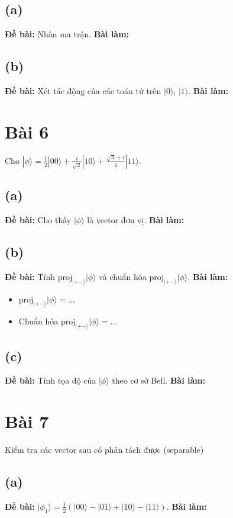 \subsection{(a)}
\textbf{Đề bài:} Nhân ma trận.
\textbf{Bài làm:}

\subsection{(b)}
\textbf{Đề bài:} Xét tác động của các toán tử trên $|0\rangle$, $|1\rangle$.
\textbf{Bài làm:}

\section{Bài 6}
Cho $|\phi\rangle=\frac{1}{2}|00\rangle+\frac{i}{\sqrt{2}}|10\rangle+\frac{\sqrt{3}+i}{4}|11\rangle$.

\subsection{(a)}
\textbf{Đề bài:} Cho thấy $|\phi\rangle$ là vector đơn vị.
\textbf{Bài làm:}

\subsection{(b)}
\textbf{Đề bài:} Tính $\mathrm{proj}_{|+-\rangle}|\phi\rangle$ và chuẩn hóa $\mathrm{proj}_{|+-\rangle}|\phi\rangle$.
\textbf{Bài làm:}
\begin{itemize}
    \item $\mathrm{proj}_{|+-\rangle}|\phi\rangle = \dots$
    \item Chuẩn hóa $\mathrm{proj}_{|+-\rangle}|\phi\rangle = \dots$
\end{itemize}

\subsection{(c)}
\textbf{Đề bài:} Tính tọa độ của $|\phi\rangle$ theo cơ sở Bell.
\textbf{Bài làm:}

\section{Bài 7}
Kiểm tra các vector sau có phân tách được (separable)

\subsection{(a)}
\textbf{Đề bài:} $|\phi_{1}\rangle=\frac{1}{2}(|00\rangle-|01\rangle+|10\rangle-|11\rangle).$
\textbf{Bài làm:}

